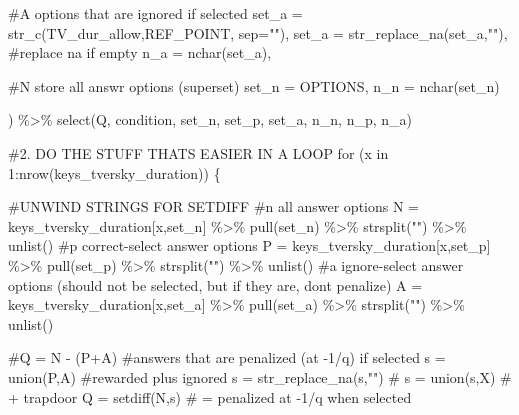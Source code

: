 \documentclass[
  letterpaper,
  DIV=11,
  numbers=noendperiod]{scrreprt}
\newenvironment{Shaded}{\begin{snugshade}}{\end{snugshade}}
\newcommand{\AttributeTok}[1]{\textcolor[rgb]{0.40,0.45,0.13}{#1}}
\newcommand{\CommentTok}[1]{\textcolor[rgb]{0.37,0.37,0.37}{#1}}
\newcommand{\ControlFlowTok}[1]{\textcolor[rgb]{0.00,0.23,0.31}{#1}}
\newcommand{\DecValTok}[1]{\textcolor[rgb]{0.68,0.00,0.00}{#1}}
\newcommand{\FunctionTok}[1]{\textcolor[rgb]{0.28,0.35,0.67}{#1}}
\newcommand{\NormalTok}[1]{\textcolor[rgb]{0.00,0.23,0.31}{#1}}
\newcommand{\OtherTok}[1]{\textcolor[rgb]{0.00,0.23,0.31}{#1}}
\newcommand{\SpecialCharTok}[1]{\textcolor[rgb]{0.37,0.37,0.37}{#1}}
\newcommand{\StringTok}[1]{\textcolor[rgb]{0.13,0.47,0.30}{#1}}
\begin{document}
\begin{Shaded}
\begin{Highlighting}[]
    \CommentTok{\#A options that are ignored if selected }
    \AttributeTok{set\_a =} \FunctionTok{str\_c}\NormalTok{(TV\_dur\_allow,REF\_POINT, }\AttributeTok{sep=}\StringTok{""}\NormalTok{),}
    \AttributeTok{set\_a =} \FunctionTok{str\_replace\_na}\NormalTok{(set\_a,}\StringTok{""}\NormalTok{), }\CommentTok{\#replace na if empty}
    \AttributeTok{n\_a =} \FunctionTok{nchar}\NormalTok{(set\_a),}
    
    \CommentTok{\#N store all answr options (superset)}
    \AttributeTok{set\_n =}\NormalTok{ OPTIONS,  }
    \AttributeTok{n\_n =} \FunctionTok{nchar}\NormalTok{(set\_n)}
  
\NormalTok{) }\SpecialCharTok{\%\textgreater{}\%} \FunctionTok{select}\NormalTok{(Q, condition, set\_n, set\_p, set\_a, n\_n, n\_p, n\_a)}

\CommentTok{\#2. DO THE STUFF THAT\textquotesingle{}S EASIER IN A LOOP}
\ControlFlowTok{for}\NormalTok{ (x }\ControlFlowTok{in} \DecValTok{1}\SpecialCharTok{:}\FunctionTok{nrow}\NormalTok{(keys\_tversky\_duration)) \{}
  
  \CommentTok{\#UNWIND STRINGS FOR SETDIFF}
  \CommentTok{\#n all answer options}
\NormalTok{  N }\OtherTok{=}\NormalTok{ keys\_tversky\_duration[x,}\StringTok{\textquotesingle{}set\_n\textquotesingle{}}\NormalTok{] }\SpecialCharTok{\%\textgreater{}\%} \FunctionTok{pull}\NormalTok{(set\_n) }\SpecialCharTok{\%\textgreater{}\%} \FunctionTok{strsplit}\NormalTok{(}\StringTok{""}\NormalTok{) }\SpecialCharTok{\%\textgreater{}\%} \FunctionTok{unlist}\NormalTok{()}
  \CommentTok{\#p correct{-}select answer options}
\NormalTok{  P }\OtherTok{=}\NormalTok{ keys\_tversky\_duration[x,}\StringTok{\textquotesingle{}set\_p\textquotesingle{}}\NormalTok{] }\SpecialCharTok{\%\textgreater{}\%} \FunctionTok{pull}\NormalTok{(set\_p) }\SpecialCharTok{\%\textgreater{}\%} \FunctionTok{strsplit}\NormalTok{(}\StringTok{""}\NormalTok{) }\SpecialCharTok{\%\textgreater{}\%} \FunctionTok{unlist}\NormalTok{()}
  \CommentTok{\#a ignore{-}select answer options (should not be selected, but if they are, don\textquotesingle{}t penalize)}
\NormalTok{  A }\OtherTok{=}\NormalTok{ keys\_tversky\_duration[x,}\StringTok{\textquotesingle{}set\_a\textquotesingle{}}\NormalTok{] }\SpecialCharTok{\%\textgreater{}\%} \FunctionTok{pull}\NormalTok{(set\_a) }\SpecialCharTok{\%\textgreater{}\%} \FunctionTok{strsplit}\NormalTok{(}\StringTok{""}\NormalTok{) }\SpecialCharTok{\%\textgreater{}\%} \FunctionTok{unlist}\NormalTok{()}
  
  \CommentTok{\#Q = N {-} (P+A)}
  \CommentTok{\#answers that are penalized (at {-}1/q) if selected }
\NormalTok{  s }\OtherTok{=} \FunctionTok{union}\NormalTok{(P,A) }\CommentTok{\#rewarded plus ignored }
\NormalTok{  s }\OtherTok{=} \FunctionTok{str\_replace\_na}\NormalTok{(s,}\StringTok{""}\NormalTok{)}
  \CommentTok{\# s = union(s,X) \# + trapdoor }
\NormalTok{  Q }\OtherTok{=} \FunctionTok{setdiff}\NormalTok{(N,s) }\CommentTok{\# = penalized at {-}1/q when selected }
  

\end{Highlighting}
\end{Shaded}
\end{document}
